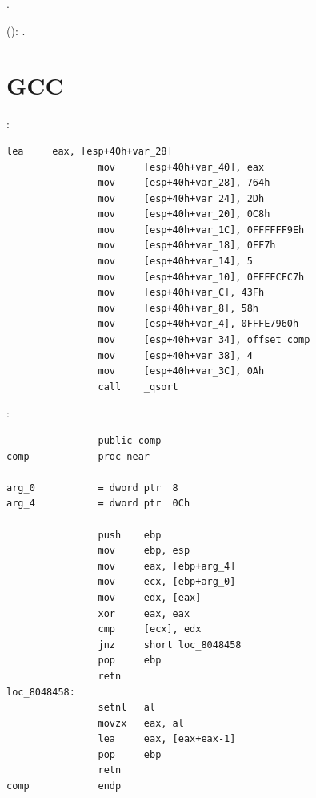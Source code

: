 .

  \AndENRU 
{}  
(): 
 \comp {}.

\fi

\section{GCC}

:

\begin{lstlisting}[caption=GCC]
                lea     eax, [esp+40h+var_28]
                mov     [esp+40h+var_40], eax
                mov     [esp+40h+var_28], 764h
                mov     [esp+40h+var_24], 2Dh
                mov     [esp+40h+var_20], 0C8h
                mov     [esp+40h+var_1C], 0FFFFFF9Eh
                mov     [esp+40h+var_18], 0FF7h
                mov     [esp+40h+var_14], 5
                mov     [esp+40h+var_10], 0FFFFCFC7h
                mov     [esp+40h+var_C], 43Fh
                mov     [esp+40h+var_8], 58h
                mov     [esp+40h+var_4], 0FFFE7960h
                mov     [esp+40h+var_34], offset comp
                mov     [esp+40h+var_38], 4
                mov     [esp+40h+var_3C], 0Ah
                call    _qsort
\end{lstlisting}

:

\begin{lstlisting}
                public comp
comp            proc near

arg_0           = dword ptr  8
arg_4           = dword ptr  0Ch

                push    ebp
                mov     ebp, esp
                mov     eax, [ebp+arg_4]
                mov     ecx, [ebp+arg_0]
                mov     edx, [eax]
                xor     eax, eax
                cmp     [ecx], edx
                jnz     short loc_8048458
                pop     ebp
                retn
loc_8048458:
                setnl   al
                movzx   eax, al
                lea     eax, [eax+eax-1]
                pop     ebp
                retn
comp            endp
\end{lstlisting}

